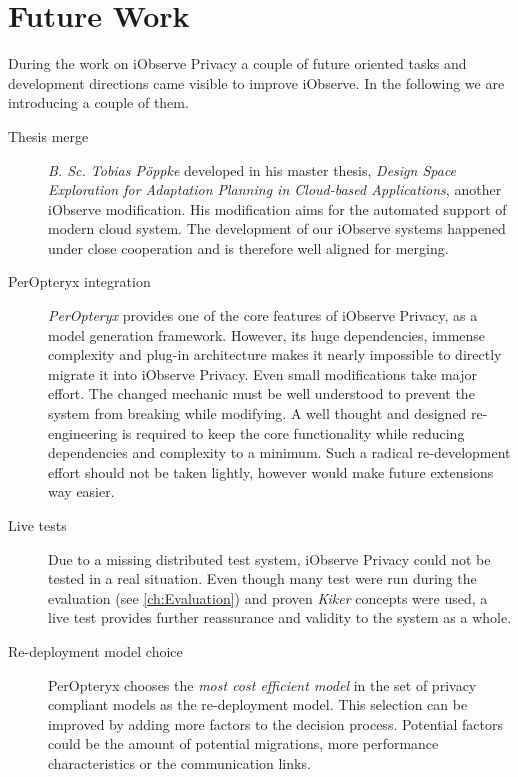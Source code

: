 \section{Future Work}
\label{sec:Conculsion:future}

During the work on iObserve Privacy a couple of future oriented tasks and development directions came visible to improve iObserve. In the following we are introducing a couple of them.

\begin{description}
	\item[Thesis merge]
	\textit{B. Sc. Tobias Pöppke} developed in his master thesis, \textit{Design Space Exploration for Adaptation Planning in Cloud-based Applications}, another iObserve modification. His modification aims for the automated support of modern cloud system. The development of our iObserve systems happened under close cooperation and is therefore well aligned for merging.
\end{description}

\begin{description}
	\item[PerOpteryx integration]
	\textit{PerOpteryx} provides one of the core features of iObserve Privacy, as a model generation framework. However, its huge dependencies, immense complexity and plug-in architecture makes it nearly impossible to directly migrate it into iObserve Privacy. Even small modifications take major effort. The changed mechanic must be well understood to prevent the system from breaking while modifying. A well thought and designed re-engineering is required to keep the core functionality while reducing dependencies and complexity to a minimum. Such a radical re-development effort should not be taken lightly, however would make future extensions way easier.
\end{description}

\begin{description}
	\item[Live tests]
	Due to a missing distributed test system, iObserve Privacy could not be tested in a real situation. Even though many test were run during the evaluation (see \autoref{ch:Evaluation}) and proven \textit{Kiker} concepts were used, a live test provides further reassurance and validity to the system as a whole. 
\end{description}

\begin{description}
	\item[Re-deployment model choice]
	PerOpteryx chooses the \textit{most cost efficient model} in the set of privacy compliant models as the re-deployment model. This selection can be improved by adding more factors to the decision process. Potential factors could be the amount of potential migrations, more performance characteristics or the communication links.
\end{description}

